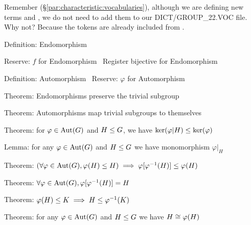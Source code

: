 Remember (\S\ref{par:characteristic:vocabularies}), although we are
defining new terms {\Tt{}\nwendquote} and {\Tt{}\nwendquote}, we do not need
to add them to our {\Tt{}DICT/GROUP{\_}22.VOC\nwendquote} file. Why not? Because the tokens
are already included from .

\nwenddocs{}\endmoddef\nwstartdeflinemarkup{}\nwenddeflinemarkup
\LA{}Definition: \code{}Endomorphism\edoc{}~{\nwtagstyle{}}\RA{}

\LA{}Reserve: $f$ for \code{}Endomorphism\edoc{}~{\nwtagstyle{}}\RA{}
\LA{}Register \code{}bijective\edoc{} for \code{}Endomorphism\edoc{}~{\nwtagstyle{}}\RA{}

\LA{}Definition: \code{}Automorphism\edoc{}~{\nwtagstyle{}}\RA{}
\LA{}Reserve: $\varphi$ for \code{}Automorphism\edoc{}~{\nwtagstyle{}}\RA{}

\LA{}Theorem: Endomorphisms preserve the trivial subgroup~{\nwtagstyle{}}\RA{}

\LA{}Theorem: Automorphisms map trivial subgroups to themselves~{\nwtagstyle{}}\RA{}

\LA{}Theorem: for $\varphi\in\operatorname{Aut}(G)$ and $H\leq G$, we have $\ker(\varphi|H)\leq\ker(\varphi)$~{\nwtagstyle{}}\RA{}

\LA{}Lemma: for any $\varphi\in\operatorname{Aut}(G)$ and $H\leq G$ we have monomorphism $\varphi|_{H}$~{\nwtagstyle{}}\RA{}

\LA{}Theorem: $(\forall\varphi\in\operatorname{Aut}(G),\varphi(H)\leq H)\implies\varphi[\varphi^{-1}(H)]\leq \varphi(H)$~{\nwtagstyle{}}\RA{}

\LA{}Theorem: $\forall\varphi\in\operatorname{Aut}(G), \varphi[\varphi^{-1}(H)]=H$~{\nwtagstyle{}}\RA{}

\LA{}Theorem: $\varphi(H)\leq K\implies H\leq\varphi^{-1}(K)$~{\nwtagstyle{}}\RA{}

\LA{}Theorem: for any $\varphi\in\operatorname{Aut}(G)$ and $H\leq G$ we have $H\cong\varphi(H)$~{\nwtagstyle{}}\RA{}

